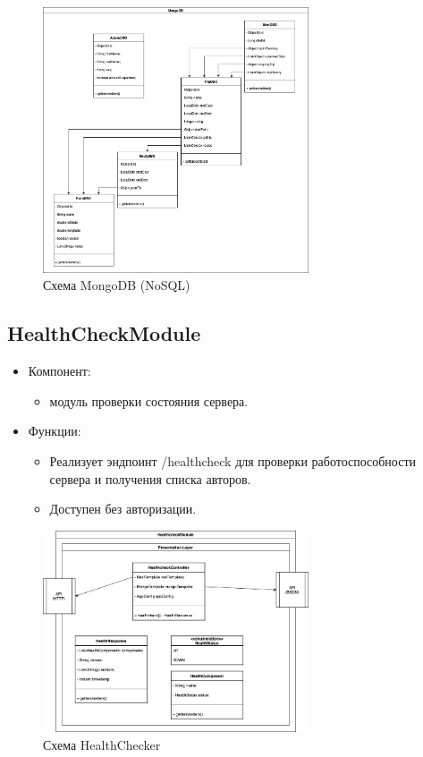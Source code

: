 \documentclass[areasetadvanced]{scrartcl}
\begin{document}
\begin{figure}[H]
  \centering
  \includegraphics[width=0.7\textwidth]{NewMongoDB.drawio.png}
  \caption{Схема MongoDB (NoSQL)}
  \label{fig:syntdiag}
\end{figure}
\newpage

\subsection{HealthCheckModule}
\begin{itemize}
  \item Компонент: 
  \begin{itemize}
    \item модуль проверки состояния сервера.
  \end{itemize} 
  \item Функции: 
  \begin{itemize}
    \item Реализует эндпоинт /healthcheck для проверки работоспособности сервера и получения списка авторов.
    \item Доступен без авторизации.
  \end{itemize}
\end{itemize}

\begin{figure}[H]
  \centering
  \includegraphics[width=0.7\textwidth]{HealthChecker.drawio.png}
  \caption{Схема HealthChecker}
  \label{fig:syntdiag}
\end{figure}
\newpage
\end{document}
